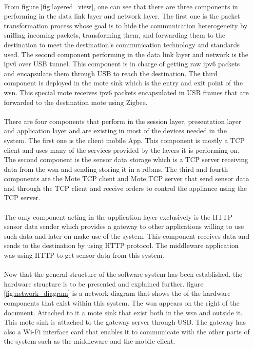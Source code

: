 \documentclass[oneside,12pt,a4paper,final]{book}
\begin{document}
\paragraph{}
From figure \ref{fig:layered_view}, one can see that there are three components in performing in the data link layer and network layer. The first one is the packet transformation process whose goal is to hide the communication heterogeneity by sniffing incoming packets, transforming them, and forwarding them to the destination to meet the destination's communication technology and standards used. The second component performing in the data link layer and network is the \gls{ipv6} over USB tunnel. This component is in charge of getting raw \gls{ipv6} packets and encapsulate them through USB to reach the destination. The third component is deployed in the mote sink which is the entry and exit point of the \gls{wsn}. This special mote receives \gls{ipv6} packets encapsulated in USB frames that are forwarded to the destination mote using Zigbee.

\paragraph{}
There are four components that perform in the session layer, presentation layer and application layer and are existing in most of the devices needed in the system. The first one is the client mobile App. This component is mostly a TCP client and uses many of the services provided by the layers it is performing on. The second component is the sensor data storage which is a TCP server receiving data from the \gls{wsn} and sending storing it in a \gls{rdbms}. The third and fourth components are the Mote TCP client and Mote TCP server that send sensor data and through the TCP client and receive orders to control the appliance using the TCP server. 
\paragraph{}
The only component acting in the application layer exclusively is the HTTP sensor data sender which provides a gateway to other applications willing to use such data and later on make use of the system. This component receives data and sends to the destination by using HTTP protocol. The middleware application was using HTTP to get sensor data from this system.
\paragraph{}
Now that the general structure of the software system has been established, the hardware structure is to be presented and explained further. figure \ref{fig:network_diagram} is a network diagram that shows the of the hardware components that exist within this system. The \gls{wsn} appears on the right of the document. Attached to it a mote sink that exist both in the \gls{wsn} and outside it. This mote sink is attached to the gateway server through USB. The gateway has also a Wi-Fi interface card that enables it to communicate with the other parts of the system such as the middleware and the mobile client.
\end{document}
